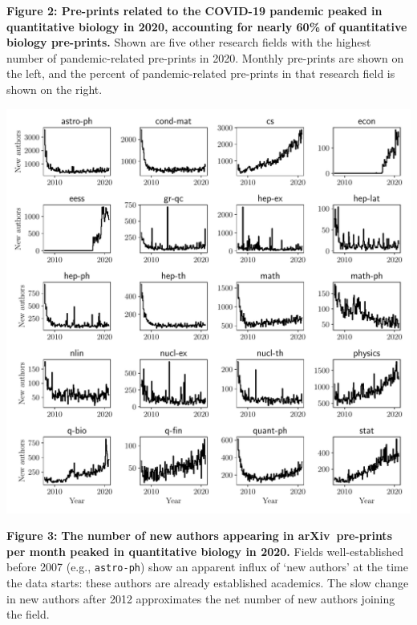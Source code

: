 \documentclass[a4paper,12pt]{article}
\newcommand{\arxiv}{arXiv}
\begin{document}
\noindent \textbf{Figure 2: Pre-prints related to the COVID-19 pandemic peaked in quantitative biology in 2020, accounting for nearly 60\% of quantitative biology pre-prints.} Shown are five other research fields with the highest number of pandemic-related pre-prints in 2020. Monthly pre-prints are shown on the left, and the percent of pandemic-related pre-prints in that research field is shown on the right.

\newpage

\begin{center}
	\includegraphics[width=0.95\linewidth]{new-authors-segmented-by-field}
\end{center}

\noindent \textbf{Figure 3:} \textbf{The number of new authors appearing in \arxiv\ pre-prints per month peaked in quantitative biology in 2020.} Fields well-established before 2007 (e.g., \texttt{astro-ph}) show an apparent influx of `new authors' at the time the data starts: these authors are already established academics. The slow change in new authors after 2012 approximates the net number of new authors joining the field.

\newpage
\end{document}

